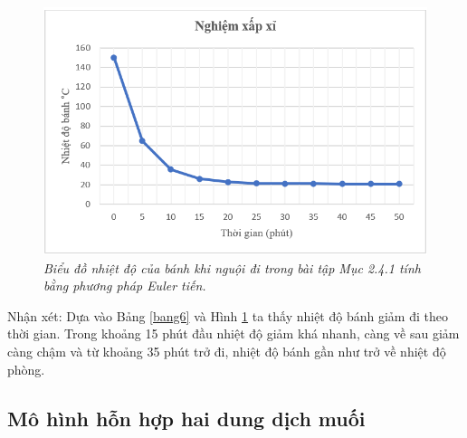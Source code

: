\begin{figure}[H]
	\centering
	\includegraphics[scale=0.85]{Images/hinh_2_10.png}
	\caption[Biểu đồ nhiệt độ của bánh khi nguội đi trong bài tập Mục 2.4.1
	tính bằng phương pháp Euler tiến.
	]{\itshape\fontsize{13pt}{0pt}\selectfont\centering Biểu đồ nhiệt độ của bánh khi nguội đi trong bài tập Mục 2.4.1 tính bằng phương pháp Euler tiến.}
	\label{hinh2.10}
\end{figure}
\noindent Nhận xét: Dựa vào Bảng \ref{bang6} và Hình \ref{hinh2.10} ta thấy nhiệt độ bánh giảm đi theo thời gian. Trong khoảng 15 phút đầu nhiệt độ giảm khá nhanh, càng về sau giảm càng chậm và từ khoảng 35 phút trở đi, nhiệt độ bánh gần như trở về nhiệt độ~ phòng. 
\subsection{Mô hình hỗn hợp hai dung dịch muối}
